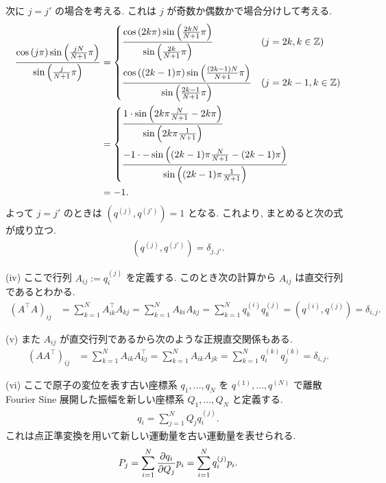 \documentclass[uplatex,dvipdfmx,a4paper,11pt]{jlreq}
\theoremstyle{definition}
\newcommand{\ZZ}{\mathbb{Z}}
\begin{document}
次に $j = j'$ の場合を考える. これは $j$ が奇数か偶数かで場合分けして考える.
\begin{align}
  \frac{\cos\qty(j\pi)\sin\qty(\frac{jN}{N+1}\pi)}{\sin\qty(\frac{j}{N+1}\pi)} & =
  \begin{dcases}
    \frac{\cos\qty(2k\pi)\sin\qty(\frac{2kN}{N+1}\pi)}{\sin\qty(\frac{2k}{N+1}\pi)}           & (j = 2k, k\in\ZZ)   \\
    \frac{\cos\qty((2k-1)\pi)\sin\qty(\frac{(2k-1)N}{N+1}\pi)}{\sin\qty(\frac{2k-1}{N+1}\pi)} & (j = 2k-1, k\in\ZZ)
  \end{dcases} \\ & =
  \begin{dcases}
    \frac{1\cdot\sin\qty(2k\pi\frac{N}{N+1} - 2k\pi)}{\sin\qty(2k\pi\frac{1}{N+1})} \\
    \frac{-1 \cdot -\sin\qty((2k-1)\pi\frac{N}{N+1} - (2k-1)\pi)}{\sin\qty((2k-1)\pi\frac{1}{N+1})}
  \end{dcases}         \\
                                                                               & = -1.
\end{align}
よって $j = j'$ のときは $(q^{(j)}, q^{(j')}) = 1$ となる. これより, まとめると次の式が成り立つ.
\begin{align}
  (q^{(j)}, q^{(j')}) = \delta_{j,j'}.
\end{align}


(iv) ここで行列 $A_{ij} := q_i^{(j)}$ を定義する. このとき次の計算から $A_{ij}$ は直交行列であるとわかる.
\begin{align}
  (A^{\top}A)_{ij} & = \sum_{k=1}^{N}A_{ik}^\top A_{kj} = \sum_{k=1}^{N}A_{ki}A_{kj} = \sum_{k=1}^{N}q_k^{(i)}q_k^{(j)} = (q^{(i)}, q^{(j)}) = \delta_{i,j}.
\end{align}

(v) また $A_{ij}$ が直交行列であるから次のような正規直交関係もある.
\begin{align}
  (AA^{\top})_{ij} & = \sum_{k=1}^{N}A_{ik}A_{kj}^{\top} = \sum_{k=1}^{N}A_{ik}A_{jk} = \sum_{k=1}^{N}q_i^{(k)}q_j^{(k)} = \delta_{i,j}.
\end{align}

(vi) ここで原子の変位を表す古い座標系 $q_1, \ldots, q_N$ を $q^{(1)}, \ldots, q^{(N)}$ で離散 Fourier Sine 展開した振幅を新しい座標系 $Q_1, \ldots, Q_N$ と定義する.
\begin{align}
  q_i = \sum_{j=1}^{N}Q_jq_i^{(j)}.
\end{align}
これは点正準変換を用いて新しい運動量を古い運動量を表せられる.
\begin{align}
  P_j = \sum_{i=1}^{N}\pdv{q_i}{Q_j}p_i = \sum_{i=1}^{N}q_i^{(j)}p_i.
\end{align}
\end{document}
